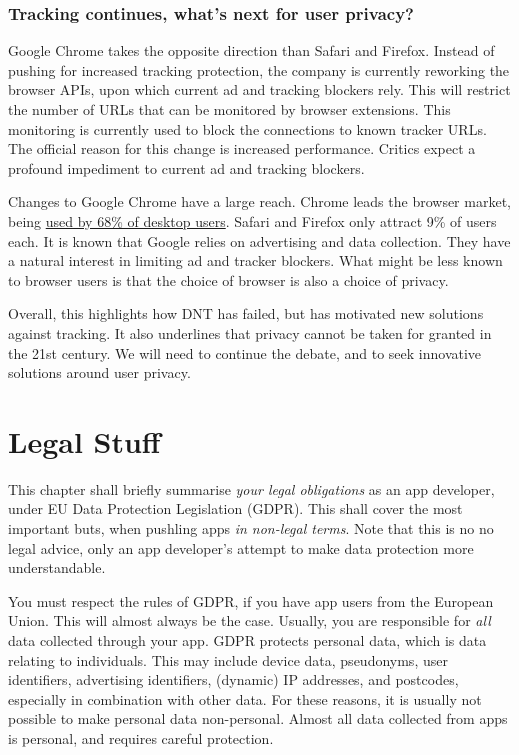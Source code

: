 \documentclass[
]{book}
\begin{document}
\hypertarget{tracking-continues-whats-next-for-user-privacy}{%
\subsection{Tracking continues, what's next for user privacy?}\label{tracking-continues-whats-next-for-user-privacy}}

Google Chrome takes the opposite direction than Safari and Firefox. Instead of pushing for increased tracking protection, the company is currently reworking the browser APIs, upon which current ad and tracking blockers rely. This will restrict the number of URLs that can be monitored by browser extensions. This monitoring is currently used to block the connections to known tracker URLs. The official reason for this change is increased performance. Critics expect a profound impediment to current ad and tracking blockers.

Changes to Google Chrome have a large reach. Chrome leads the browser market, being \href{https://gs.statcounter.com/browser-market-share/desktop/worldwide}{used by 68\% of desktop users}. Safari and Firefox only attract 9\% of users each. It is known that Google relies on advertising and data collection. They have a natural interest in limiting ad and tracker blockers. What might be less known to browser users is that the choice of browser is also a choice of privacy.

Overall, this highlights how DNT has failed, but has motivated new solutions against tracking. It also underlines that privacy cannot be taken for granted in the 21st century. We will need to continue the debate, and to seek innovative solutions around user privacy.

\hypertarget{legal-stuff}{%
\chapter{Legal Stuff}\label{legal-stuff}}

This chapter shall briefly summarise \emph{your legal obligations} as an app developer, under EU Data Protection Legislation (GDPR). This shall cover the most important buts, when pushling apps \emph{in non-legal terms}. Note that this is no no legal advice, only an app developer's attempt to make data protection more understandable.

You must respect the rules of GDPR, if you have app users from the European Union. This will almost always be the case. Usually, you are responsible for \emph{all} data collected through your app. GDPR protects personal data, which is data relating to individuals. This may include device data, pseudonyms, user identifiers, advertising identifiers, (dynamic) IP addresses, and postcodes, especially in combination with other data. For these reasons, it is usually not possible to make personal data non-personal. Almost all data collected from apps is personal, and requires careful protection.
\end{document}
